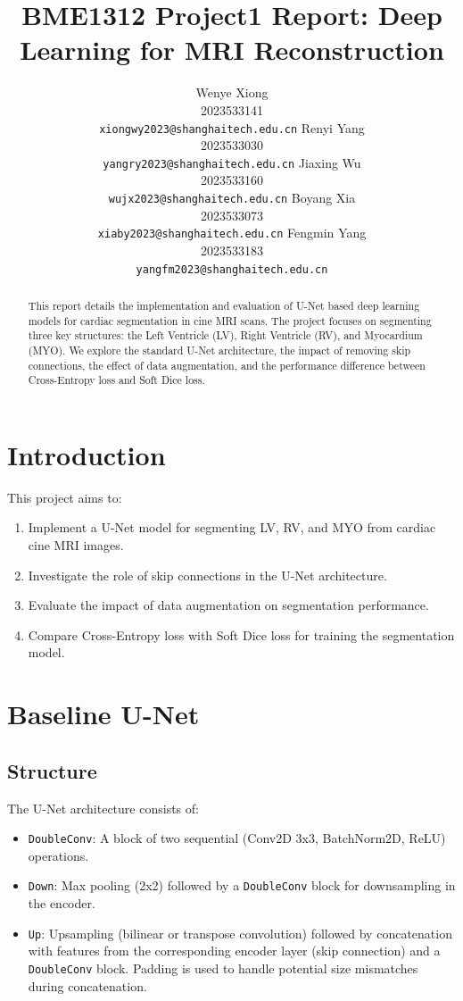 \documentclass{article}
\title{BME1312 Project1 Report: Deep Learning for MRI Reconstruction}
\author{%
  Wenye Xiong \\
  2023533141 \\
  \texttt{xiongwy2023@shanghaitech.edu.cn}
  \And
  Renyi Yang \\
  2023533030 \\
  \texttt{yangry2023@shanghaitech.edu.cn}
  \AND
  Jiaxing Wu \\
  2023533160 \\
  \texttt{wujx2023@shanghaitech.edu.cn}
  \And
  Boyang Xia \\
  2023533073 \\
  \texttt{xiaby2023@shanghaitech.edu.cn}
  \AND
  Fengmin Yang \\
  2023533183 \\
  \texttt{yangfm2023@shanghaitech.edu.cn}
}
\begin{document}
\maketitle


\begin{abstract}
This report details the implementation and evaluation of U-Net based deep learning models for cardiac segmentation 
in cine MRI scans. The project focuses on segmenting three key structures: the Left Ventricle (LV), Right Ventricle (RV), 
and Myocardium (MYO). We explore the standard U-Net architecture, the impact of removing skip connections, the effect of 
data augmentation, and the performance difference between Cross-Entropy loss and Soft Dice loss.
\end{abstract}

\section{Introduction}
This project aims to:
\begin{enumerate}
  \item Implement a U-Net model for segmenting LV, RV, and MYO from cardiac cine MRI images.
  \item Investigate the role of skip connections in the U-Net architecture.
  \item Evaluate the impact of data augmentation on segmentation performance.
  \item Compare Cross-Entropy loss with Soft Dice loss for training the segmentation model.
\end{enumerate}



\section{Baseline U-Net}

\subsection{Structure}
The U-Net architecture consists of:
\begin{itemize}
  \item \texttt{DoubleConv}: A block of two sequential (Conv2D 3x3, BatchNorm2D, ReLU) operations.
  \item \texttt{Down}: Max pooling (2x2) followed by a \texttt{DoubleConv} block for downsampling in the encoder.
  \item \texttt{Up}: Upsampling (bilinear or transpose convolution) followed by concatenation with features from the 
  corresponding encoder layer (skip connection) and a \texttt{DoubleConv} block. Padding is used to handle potential 
  size mismatches during concatenation.
\end{itemize}
\end{document}
